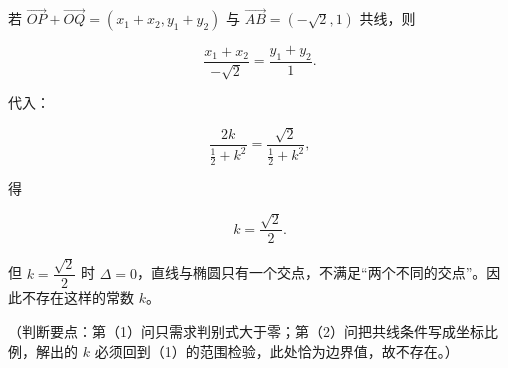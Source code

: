 \begin{answer}
若 $\overrightarrow{OP}+\overrightarrow{OQ}=(x_1+x_2,y_1+y_2)$ 与 $\overrightarrow{AB}=(-\sqrt2,1)$ 共线，则

\nopagebreak[4]
\[\frac{x_1+x_2}{-\sqrt2}=\frac{y_1+y_2}{1}.\]

代入：

\nopagebreak[4]
\[\frac{2k}{\frac12+k^2}=\frac{\sqrt2}{\frac12+k^2},\]

得

\nopagebreak[4]
\[k=\frac{\sqrt2}{2}.\]

但 $k=\dfrac{\sqrt2}{2}$ 时 $\Delta=0$，直线与椭圆只有一个交点，不满足“两个不同的交点”。因此不存在这样的常数 $k$。

（判断要点：第（1）问只需求判别式大于零；第（2）问把共线条件写成坐标比例，解出的 $k$ 必须回到（1）的范围检验，此处恰为边界值，故不存在。）


\end{answer}
